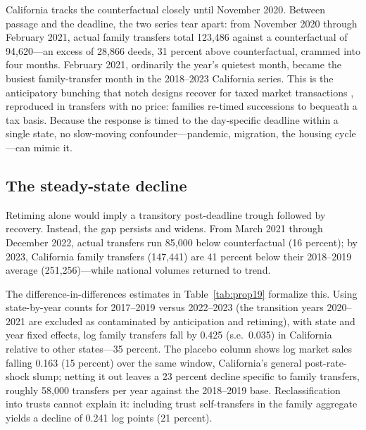 \documentclass[12pt, letterpaper]{article}
\begin{document}
California tracks the counterfactual closely until November 2020. Between
passage and the deadline, the two series tear apart: from November 2020
through February 2021, actual family transfers total 123,486 against a
counterfactual of 94,620---an excess of 28,866 deeds, 31 percent above
counterfactual, crammed into four months. February 2021, ordinarily the
year's quietest month, became the busiest family-transfer month in the
2018--2023 California series. This is the anticipatory bunching that notch
designs recover for taxed market transactions \citep{bestkleven2018notches,
slemrodwebershan2017dc}, reproduced in transfers with no price: families
re-timed successions to bequeath a tax basis. Because the response is timed
to the day-specific deadline within a single state, no slow-moving
confounder---pandemic, migration, the housing cycle---can mimic it.

\subsection{The steady-state decline}

Retiming alone would imply a transitory post-deadline trough followed by
recovery. Instead, the gap persists and widens. From March 2021 through
December 2022, actual transfers run 85,000 below counterfactual (16
percent); by 2023, California family transfers (147,441) are 41 percent below
their 2018--2019 average (251,256)---while national volumes returned to
trend.

The difference-in-differences estimates in Table~\ref{tab:prop19} formalize
this. Using state-by-year counts for 2017--2019 versus 2022--2023 (the
transition years 2020--2021 are excluded as contaminated by anticipation and
retiming), with state and year fixed effects, log family transfers fall by
0.425 (s.e.\ 0.035) in California relative to other states---35 percent. The
placebo column shows log market sales falling 0.163 (15 percent) over the
same window, California's general post-rate-shock slump; netting it out
leaves a 23 percent decline specific to family transfers, roughly 58,000
transfers per year against the 2018--2019 base. Reclassification into trusts
cannot explain it: including trust self-transfers in the family aggregate
yields a decline of 0.241 log points (21 percent).
\end{document}
